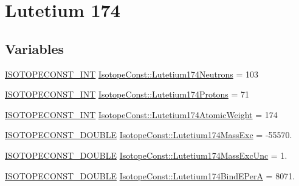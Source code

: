 \hypertarget{group___isotope_const-_lutetium-_lu174}{}\section{Lutetium 174}
\label{group___isotope_const-_lutetium-_lu174}
\subsection*{Variables}
\begin{DoxyCompactItemize}
\item 
\mbox{\hyperlink{group___isotope_const-_macros_ga5f18360b3e99483a35c32d789e62621c}{I\+S\+O\+T\+O\+P\+E\+C\+O\+N\+S\+T\+\_\+\+I\+NT}} \mbox{\hyperlink{group___isotope_const-_lutetium-_lu174_gaa0ed9a64e0a4ef154d1965099135262c}{Isotope\+Const\+::\+Lutetium174\+Neutrons}} = 103
\item 
\mbox{\hyperlink{group___isotope_const-_macros_ga5f18360b3e99483a35c32d789e62621c}{I\+S\+O\+T\+O\+P\+E\+C\+O\+N\+S\+T\+\_\+\+I\+NT}} \mbox{\hyperlink{group___isotope_const-_lutetium-_lu174_ga50e4da82712b882dacc49bf97b7a56d0}{Isotope\+Const\+::\+Lutetium174\+Protons}} = 71
\item 
\mbox{\hyperlink{group___isotope_const-_macros_ga5f18360b3e99483a35c32d789e62621c}{I\+S\+O\+T\+O\+P\+E\+C\+O\+N\+S\+T\+\_\+\+I\+NT}} \mbox{\hyperlink{group___isotope_const-_lutetium-_lu174_ga4aaf4a98f3da92d29ae25affb38d2c0f}{Isotope\+Const\+::\+Lutetium174\+Atomic\+Weight}} = 174
\item 
\mbox{\hyperlink{group___isotope_const-_macros_ga8f45a7272ce02c0b4c65c44636ed719a}{I\+S\+O\+T\+O\+P\+E\+C\+O\+N\+S\+T\+\_\+\+D\+O\+U\+B\+LE}} \mbox{\hyperlink{group___isotope_const-_lutetium-_lu174_ga790823f25b2c3e9efb94654baf3ed092}{Isotope\+Const\+::\+Lutetium174\+Mass\+Exc}} = -\/55570.
\item 
\mbox{\hyperlink{group___isotope_const-_macros_ga8f45a7272ce02c0b4c65c44636ed719a}{I\+S\+O\+T\+O\+P\+E\+C\+O\+N\+S\+T\+\_\+\+D\+O\+U\+B\+LE}} \mbox{\hyperlink{group___isotope_const-_lutetium-_lu174_ga975ac0ff59ab5cfc9bc0c0e75fdde3d2}{Isotope\+Const\+::\+Lutetium174\+Mass\+Exc\+Unc}} = 1.
\item 
\mbox{\hyperlink{group___isotope_const-_macros_ga8f45a7272ce02c0b4c65c44636ed719a}{I\+S\+O\+T\+O\+P\+E\+C\+O\+N\+S\+T\+\_\+\+D\+O\+U\+B\+LE}} \mbox{\hyperlink{group___isotope_const-_lutetium-_lu174_ga5eb85d8c8859e283fddeea1da5b49866}{Isotope\+Const\+::\+Lutetium174\+Bind\+E\+PerA}} = 8071.
\item 

\end{DoxyCompactItemize}
